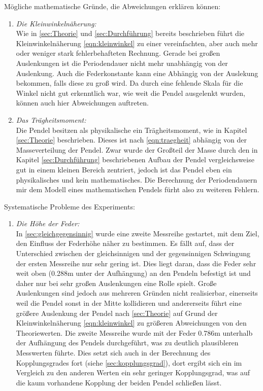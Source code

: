 Mögliche mathematische Gründe, die Abweichungen erklären können:
\begin{enumerate}
    \item \textit{Die Kleinwinkelnäherung:}\\
        Wie in \ref{sec:Theorie} und \ref{sec:Durchführung} bereits beschrieben führt die Kleinwinkelnäherung \eqref{eqn:kleinwinkel}
        zu einer vereinfachten, aber auch mehr oder weniger stark fehlerbehafteten Rechnung. Gerade bei großen Auslenkungen ist die
        Periodendauer nicht mehr unabhängig von der Auslenkung. Auch die Federkonstante kann eine Abhängig von
        der Auslekung bekommen, falls diese zu groß wird. Da durch eine fehlende Skala für die Winkel nicht gut erkenntlich war,
        wie weit die Pendel ausgelenkt wurden, können auch hier Abweichungen auftreten.
    \item \textit{Das Trägheitsmoment:}\\
        Die Pendel besitzen als physikalische ein Trägheitsmoment, wie in Kapitel \ref{sec:Theorie} beschrieben. Dieses ist nach
        \eqref{eqn:traegheit} abhängig von der Masseverteilung der Pendel. Zwar wurde der Großteil der Masse durch den in
        Kapitel \ref{sec:Durchführung} beschriebenen Aufbau der Pendel vergleichsweise gut in einem kleinen Bereich zentriert,
        jedoch ist das Pendel eben ein physikalisches und kein mathematisches. Die Berechnung der Periodendauern mir dem
        Modell eines mathematischen Pendels fürht also zu weiteren Fehlern.
\end{enumerate}
Systematische Probleme des Experiments:
\begin{enumerate}
    \item \textit{Die Höhe der Feder:} \\
    In \ref{sec:gleichgegensinnig} wurde eine zweite Messreihe gestartet, mit dem Ziel, den Einfluss der Federhöhe näher zu bestimmen.
    Es fällt auf, dass der Unterschied zwischen der gleichsinnigen und der gegensinnigen Schwingung der ersten Messreihe nur sehr gering ist.
    Dies liegt daran, dass die Feder sehr weit oben (0.288m unter der Aufhängung) an den Pendeln befestigt ist und daher nur bei sehr großen
    Auslenkungen eine Rolle spielt. Große Auslenkungen sind jedoch aus mehreren Gründen nicht realisierbar, einerseits weil die Pendel sonst
    in der Mitte kollidieren und andererseits führt eine größere Auslenkung der Pendel nach \ref{sec:Theorie} auf Grund der Kleinwinkelnäherung
    \eqref{eqn:kleinwinkel} zu größeren Abweichungen von den Theoriewerten. Die zweite Messreihe wurde mit der
    Feder 0.786m unterhalb der Aufhängung des Pendels durchgeführt, was zu
    deutlich plausibleren Messwerten führte. Dies setzt sich auch in der Berechnung des Kopplungsgrades fort (siehe \ref{sec:kopplungsgrad}),
    dort ergibt sich ein im Vergleich zu den anderen Werten ein sehr geringer Kopplungsgrad, was auf die kaum vorhandene Kopplung der beiden Pendel schließen lässt.
\end{enumerate}
